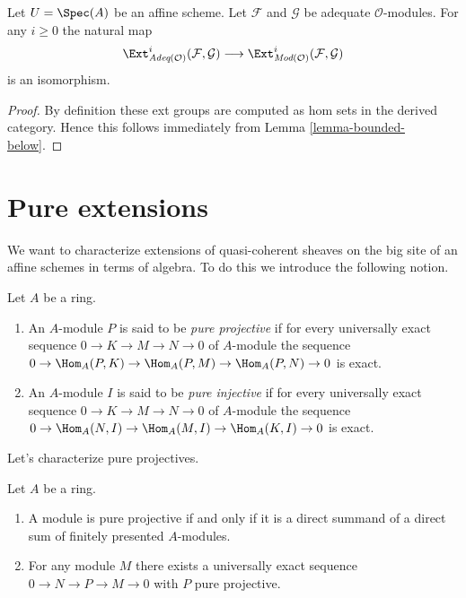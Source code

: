 \begin{lemma}
\label{lemma-ext-adequate}
Let $U = \Spec(A)$ be an affine scheme.
Let $\mathcal{F}$ and $\mathcal{G}$ be adequate $\mathcal{O}$-modules.
For any $i \geq 0$ the natural map
$$
\Ext^i_{\textit{Adeq}(\mathcal{O})}(\mathcal{F}, \mathcal{G})
\longrightarrow
\Ext^i_{\textit{Mod}(\mathcal{O})}(\mathcal{F}, \mathcal{G})
$$
is an isomorphism.
\end{lemma}

\begin{proof}
By definition these ext groups are computed as hom sets in the
derived category. Hence this follows immediately from
Lemma \ref{lemma-bounded-below}.
\end{proof}









\section{Pure extensions}
\label{section-pure}

\noindent
We want to characterize extensions of quasi-coherent sheaves on
the big site of an affine schemes in terms of algebra. To do this
we introduce the following notion.

\begin{definition}
\label{definition-pure}
Let $A$ be a ring.
\begin{enumerate}
\item An $A$-module $P$ is said to be {\it pure projective}
if for every universally exact sequence
$0 \to K \to M \to N \to 0$ of $A$-module the sequence
$0 \to \Hom_A(P, K) \to \Hom_A(P, M) \to \Hom_A(P, N) \to 0$
is exact.
\item An $A$-module $I$ is said to be {\it pure injective}
if for every universally exact sequence
$0 \to K \to M \to N \to 0$ of $A$-module the sequence
$0 \to \Hom_A(N, I) \to \Hom_A(M, I) \to \Hom_A(K, I) \to 0$
is exact.
\end{enumerate}
\end{definition}

\noindent
Let's characterize pure projectives.

\begin{lemma}
\label{lemma-pure-projective}
Let $A$ be a ring.
\begin{enumerate}
\item A module is pure projective if and only if
it is a direct summand of a direct sum of finitely presented $A$-modules.
\item For any module $M$ there exists a universally exact sequence
$0 \to N \to P \to M \to 0$ with $P$ pure projective.
\end{enumerate}
\end{lemma}

